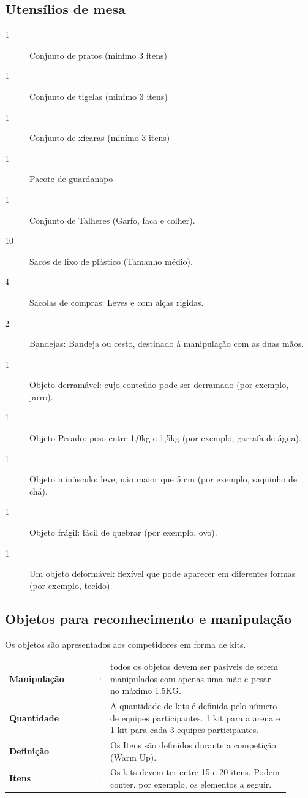 \documentclass[11pt, twoside, openright, a4paper, chapterprefix]{article}
\begin{document}
\subsection{Utensílios de mesa}
\begin{description}
    \item [1] Conjunto de pratos (minímo 3 itens)
    \item [1] Conjunto de tigelas (minímo 3 itens)
    \item [1] Conjunto de xícaras (minímo 3 itens)
    \item [1] Pacote de guardanapo
    \item [1] Conjunto de Talheres (Garfo, faca e colher).
    \item [10] Sacos de lixo de plástico (Tamanho médio). 
    \item [4] Sacolas de compras: Leves e com alças rigidas.
    \item [2] Bandejas: Bandeja ou cesto, destinado à manipulação com as duas mãos.
    \item [1] Objeto derramável: cujo conteúdo pode ser derramado (por exemplo, jarro). 
    \item [1] Objeto Pesado: peso entre 1,0kg e 1,5kg (por exemplo, garrafa de água). 
    \item [1] Objeto minúsculo: leve, não maior que 5 cm (por exemplo, saquinho de chá). 
    \item [1] Objeto frágil: fácil de quebrar (por exemplo, ovo).
    \item [1] Um objeto deformável: flexível que pode aparecer em diferentes formas (por exemplo, tecido).
   
\end{description}

\subsection{Objetos para reconhecimento e manipulação}

Os objetos são apresentados aos competidores em forma de kits.

\begin{tabular}{ p{0.3\linewidth} p{0.01\linewidth} p{0.6\linewidth}}
    \textbf{Manipulação}   & : & todos os objetos devem ser pasiveis de serem manipulados com apenas uma mão e pesar no máximo 1.5KG. \\
    \textbf{Quantidade}     & : & A quantidade de kits é definida pelo número de equipes participantes. 1 kit para a arena e 1 kit para cada 3 equipes participantes. \\
    \textbf{Definição}       & : & Os Itens são definidos durante a competição (Warm Up). \\
    \textbf{Itens}                & : & Os kits devem ter entre 15 e 20 itens. Podem conter, por exemplo, os elementos a seguir. 
\end{tabular}
\end{document}
